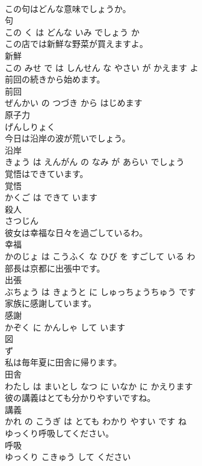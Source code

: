 \documentclass[8pt]{extreport}
\begin{document}
\begin{CJK}{UTF8}{min}
\\	この句はどんな意味でしょうか。	
\\	句 
\\	この く は どんな いみ でしょう か			
\\	この店では新鮮な野菜が買えますよ。	
\\	新鮮 
\\	この みせ で は しんせん な やさい が かえます よ			
\\	前回の続きから始めます。	
\\	前回 
\\	ぜんかい の つづき から はじめます			
\\	原子力	
\\	げんしりょく			
\\	今日は沿岸の波が荒いでしょう。	
\\	沿岸 
\\	きょう は えんがん の なみ が あらい でしょう			
\\	覚悟はできています。	
\\	覚悟 
\\	かくご は できて います			
\\	殺人	
\\	さつじん			
\\	彼女は幸福な日々を過ごしているわ。	
\\	幸福 
\\	かのじょ は こうふく な ひび を すごして いる わ			
\\	部長は京都に出張中です。	
\\	出張 
\\	ぶちょう は きょうと に しゅっちょうちゅう です			
\\	家族に感謝しています。	
\\	感謝 
\\	かぞく に かんしゃ して います			
\\	図	
\\	ず			
\\	私は毎年夏に田舎に帰ります。	
\\	田舎 
\\	わたし は まいとし なつ に いなか に かえります			
\\	彼の講義はとても分かりやすいですね。	
\\	講義 
\\	かれ の こうぎ は とても わかり やすい です ね			
\\	ゆっくり呼吸してください。	
\\	呼吸 
\\	ゆっくり こきゅう して ください			

\end{CJK}
\end{document}
